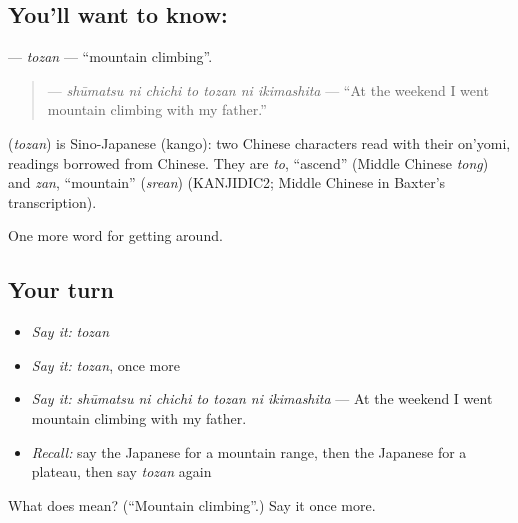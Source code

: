 \subsection*{You'll want to know: }
\textbf{} — \emph{tozan} — \textquotedblleft{}mountain climbing\textquotedblright{}.

\begin{quote}
\textbf{   } — \emph{shūmatsu ni chichi to tozan ni ikimashita} — \textquotedblleft{}At the weekend I went mountain climbing with my father.\textquotedblright{}
\end{quote}

\begin{cousinweb}
\textbf{} (\emph{tozan}) is Sino-Japanese (kango): two Chinese characters read with their on'yomi, readings borrowed from Chinese. They are \emph{to}, \textquotedblleft{}ascend\textquotedblright{} (Middle Chinese \emph{tong}) and \emph{zan}, \textquotedblleft{}mountain\textquotedblright{} (\emph{srean}) (KANJIDIC2; Middle Chinese in Baxter's transcription).
\end{cousinweb}

\begin{grammarlens}[title={What you've built}]
One more word for getting around.
\end{grammarlens}

\subsection*{Your turn}
\begin{itemize}
\raggedright
  \item \emph{Say it:} \emph{tozan}
  \item \emph{Say it:} \emph{tozan}, once more
  \item \emph{Say it:} \emph{shūmatsu ni chichi to tozan ni ikimashita} — At the weekend I went mountain climbing with my father.
  \item \emph{Recall:} say the Japanese for a mountain range, then the Japanese for a plateau, then say \emph{tozan} again
\end{itemize}

\begin{tcolorbox}[breakable,colback=teal!4,colframe=teal!35!black,title={Before you move on}]
What does  mean? (\textquotedblleft{}Mountain climbing\textquotedblright{}.) Say it once more.
\end{tcolorbox}
